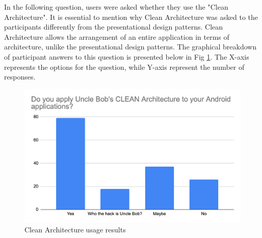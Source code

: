 In the following question, users were asked whether they use the "Clean Architecture". It is essential to mention why Clean Architecture was asked to the participants differently from the presentational design patterns. Clean Architecture allows the arrangement of an entire application in terms of architecture, unlike the presentational design patterns. The graphical breakdown of participant answers to this question is presented below in Fig \ref{fig:clean_arch}. The X-axis represents the options for the question, while Y-axis represent the number of responses.
\begin{figure}[ht!]
    \centering
    \includegraphics[scale=0.33]{figures/survey_q4_clean_arch.png}
    \caption{Clean Architecture usage results}
    \label{fig:clean_arch}
\end{figure}
\FloatBarrier

